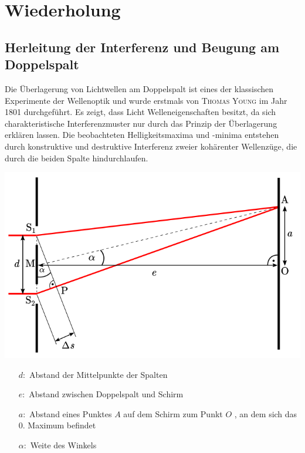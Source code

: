 \documentclass[11pt,a4paper,oneside]{article}
\newcommand{\lessondate}[1]{\noindent\hfill\textcolor{MarginalGray}{\textsc{#1}} \\ \vspace{0.5cm}}
\begin{document}
	\newpage
	
	
	\section{Wiederholung}
	
	\subsection{Herleitung der Interferenz und Beugung am Doppelspalt}
	Die Überlagerung von Lichtwellen am Doppelspalt ist eines der klassischen Experimente der Wellenoptik und wurde erstmals von \textsc{Thomas Young} im Jahr 1801 durchgeführt. Es zeigt, dass Licht Welleneigenschaften besitzt, da sich charakteristische Interferenzmuster nur durch das Prinzip der Überlagerung erklären lassen. Die beobachteten Helligkeitsmaxima und -minima entstehen durch konstruktive und destruktive Interferenz zweier kohärenter Wellenzüge, die durch die beiden Spalte hindurchlaufen.
	
	
	\begin{minipage}[t]{0.45\textwidth}
		\vspace{0mm}
		\includegraphics[width=\textwidth]{Doppelspalt_Einstiegsaufgaben_Bild.png}
	\end{minipage}%
	\hfill
	\begin{minipage}[t]{0.45\textwidth}
		\vspace{0pt} %
		\begin{itemize}
			\item [$d:$] Abstand der Mittelpunkte der Spalten 
			\item [$e:$] Abstand zwischen Doppelspalt und Schirm 
			\item [$a:$] Abstand eines Punktes $A$ auf dem Schirm zum Punkt $O$ , an dem sich das 0. Maximum befindet
			\item [$\alpha:$] Weite des Winkels 
		\end{itemize}
	\end{minipage}
\end{document}
